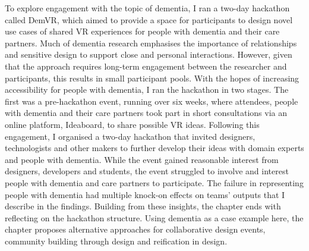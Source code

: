 To explore engagement with the topic of dementia, I ran a two-day hackathon called DemVR, which aimed to provide a space for participants to design novel use cases of shared VR experiences for people with dementia and their care partners. Much of dementia research emphasises the importance of relationships and sensitive design to support close and personal interactions. However, given that the approach requires long-term engagement between the researcher and participants, this results in small participant pools. With the hopes of increasing accessibility for people with dementia, I ran the hackathon in two stages. The first was a pre-hackathon event, running over six weeks, where attendees, people with dementia and their care partners took part in short consultations via an online platform, Ideaboard, to share possible VR ideas. Following this engagement, I organised a two-day hackathon that invited designers, technologists and other makers to further develop their ideas with domain experts and people with dementia. While the event gained reasonable interest from designers, developers and students, the event struggled to involve and interest people with dementia and care partners to participate. The failure in representing people with dementia had multiple knock-on effects on teams' outputs that I describe in the findings. Building from these insights, the chapter ends with reflecting on the hackathon structure. Using dementia as a case example here, the chapter proposes alternative approaches for collaborative design events, community building through design and reification in design.



